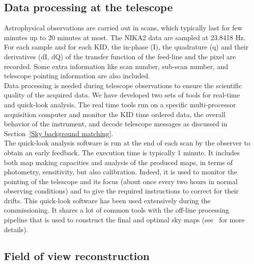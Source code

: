 \documentclass[]{aa} %
\begin{document}
\subsection{Data processing at the telescope}
\label{Data processing at the telescope}

Astrophysical observations are carried out in scans, which typically last for few minutes up to 20 minutes at most.
The NIKA2 data are sampled at 23.8418 Hz. For each sample and for each KID, the in-phase (I), the quadrature
(q) and their derivatives (dI, dQ) of the transfer function of the feed-line and the pixel are recorded.
Some extra information like scan number, sub-scan number, and telescope pointing information are also included. \\

Data processing is needed during telescope observations to ensure the scientific quality of the acquired data.
We have developed two sets of tools for real-time and quick-look analysis. The real time tools run on a specific multi-processor acquisition computer and monitor the KID time ordered data, the overall behavior of the instrument, and decode telescope messages as discussed in Section~\ref{Sky background matching}. \\

The quick-look analysis software is run at the end of each scan by the observer to obtain an early feedback. The execution time is typically 1 minute. It includes both map making capacities and analysis of the produced maps, in terms of photometry, sensitivity, but also calibration. Indeed, it is used to monitor the pointing of the telescope and its focus (about once every two hours in normal observing conditions) and to give the required instructions to correct for their drifts. This quick-look software has been used extensively during the commissioning. It shares a lot of common tools with the off-line processing pipeline that is used to construct the final and optimal sky maps (see~\cite{ponthieu} for more details).

\subsection{Field of view reconstruction}
\end{document}
